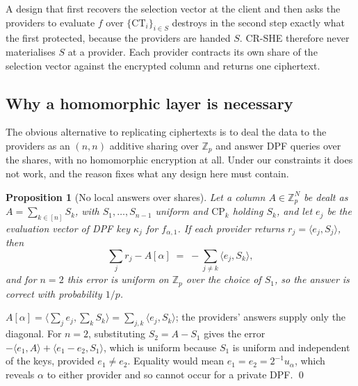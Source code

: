 \documentclass[a4paper,fleqn]{cas-dc}
\newtheorem{proposition}{Proposition}
\begin{document}
A design that first recovers the selection vector at the client and then asks
the providers to evaluate $f$ over $\{\text{CT}_i\}_{i\in S}$ destroys in the
second step exactly what the first protected, because the providers are handed
$S$. CR-SHE therefore never materialises $S$ at a provider. Each provider
contracts its own share of the selection vector against the encrypted column
and returns one ciphertext.

\subsection{Why a homomorphic layer is necessary}
\label{sec:whyrep}
The obvious alternative to replicating ciphertexts is to deal the data to the
providers as an $(n,n)$ additive sharing over $\mathbb{Z}_p$ and answer DPF
queries over the shares, with no homomorphic encryption at all. Under our
constraints it does not work, and the reason fixes what any design here must
contain.

\begin{proposition}[No local answers over shares]
\label{prop:nolocal}
Let a column $A\in\mathbb{Z}_p^N$ be dealt as $A=\sum_{k\in[n]}S_k$, with
$S_1,\dots,S_{n-1}$ uniform and $\text{CP}_k$ holding $S_k$, and let $e_j$ be
the evaluation vector of DPF key $\kappa_j$ for $f_{\alpha,1}$. If each
provider returns $r_j=\langle e_j,S_j\rangle$, then
\[
\textstyle\sum_{j} r_j - A[\alpha] \;=\; -\sum_{j\neq k}\langle e_j,S_k\rangle ,
\]
and for $n=2$ this error is uniform on $\mathbb{Z}_p$ over the choice of
$S_1$, so the answer is correct with probability $1/p$.
\end{proposition}
\begin{pf}
$A[\alpha]=\langle\sum_j e_j,\sum_k S_k\rangle=\sum_{j,k}\langle e_j,S_k\rangle$;
the providers' answers supply only the diagonal. For $n=2$, substituting
$S_2=A-S_1$ gives the error $-\langle e_1,A\rangle+\langle e_1-e_2,S_1\rangle$,
which is uniform because $S_1$ is uniform and independent of the keys, provided
$e_1\neq e_2$. Equality would mean $e_1=e_2=2^{-1}u_\alpha$, which reveals
$\alpha$ to either provider and so cannot occur for a private DPF. \qed
\end{pf}
\end{document}
